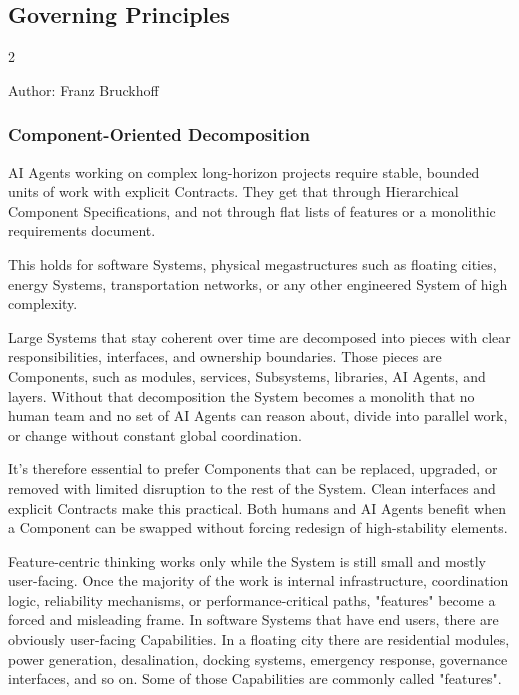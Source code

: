 \subsection{Governing Principles}
\label{app:principles}

\begin{multicols}{2}

\par\medskip

Author: Franz Bruckhoff

\hypertarget{gp-COD}{}

\subsubsection*{Component-Oriented Decomposition}

AI Agents working on complex long-horizon projects require stable, bounded units of work with explicit Contracts. They get that through Hierarchical Component Specifications, and not through flat lists of features or a monolithic requirements document.

This holds for software Systems, physical megastructures such as floating cities, energy Systems, transportation networks, or any other engineered System of high complexity.

Large Systems that stay coherent over time are decomposed into pieces with clear responsibilities, interfaces, and ownership boundaries. Those pieces are Components, such as modules, services, Subsystems, libraries, AI Agents, and layers. Without that decomposition the System becomes a monolith that no human team and no set of AI Agents can reason about, divide into parallel work, or change without constant global coordination.

It's therefore essential to prefer Components that can be replaced, upgraded, or removed with limited disruption to the rest of the System. Clean interfaces and explicit Contracts make this practical. Both humans and AI Agents benefit when a Component can be swapped without forcing redesign of high-stability elements.

Feature-centric thinking works only while the System is still small and mostly user-facing. Once the majority of the work is internal infrastructure, coordination logic, reliability mechanisms, or performance-critical paths, "features" become a forced and misleading frame. In software Systems that have end users, there are obviously user-facing Capabilities. In a floating city there are residential modules, power generation, desalination, docking systems, emergency response, governance interfaces, and so on. Some of those Capabilities are commonly called "features".


\end{multicols}
